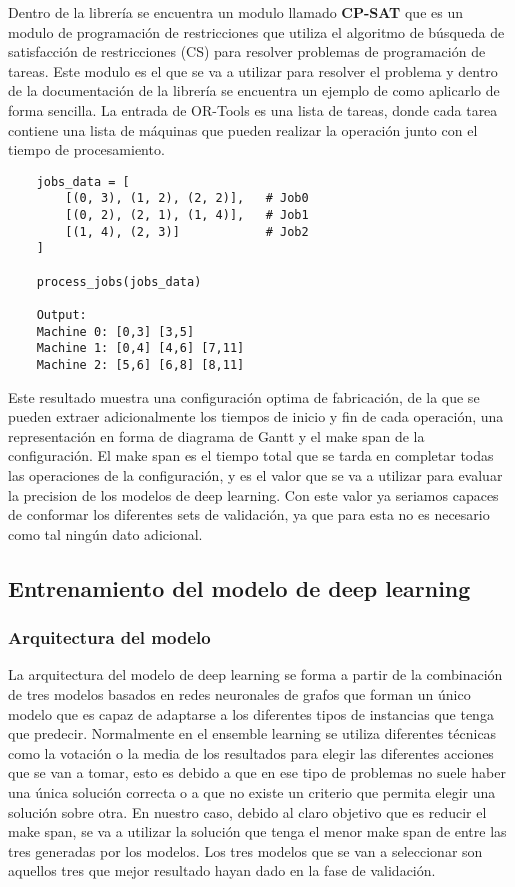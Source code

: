 Dentro de la librería se encuentra un modulo llamado \textbf{CP-SAT} que es un modulo de programación
de restricciones que utiliza el algoritmo de búsqueda de satisfacción de restricciones (CS) para resolver
problemas de programación de tareas. Este modulo es el que se va a utilizar para resolver el problema y
dentro de la documentación \cite{ortools-jobshop} de la librería se encuentra un ejemplo de como 
aplicarlo de forma sencilla. La entrada de OR-Tools es una lista de tareas, donde cada tarea contiene
una lista de máquinas que pueden realizar la operación junto con el tiempo de procesamiento.\medskip

\begin{lstlisting}
    jobs_data = [                   
        [(0, 3), (1, 2), (2, 2)],   # Job0
        [(0, 2), (2, 1), (1, 4)],   # Job1
        [(1, 4), (2, 3)]            # Job2
    ]
   
    process_jobs(jobs_data)

    Output:
    Machine 0: [0,3] [3,5]
    Machine 1: [0,4] [4,6] [7,11]
    Machine 2: [5,6] [6,8] [8,11]
\end{lstlisting}

Este resultado muestra una configuración optima de fabricación, de la que se pueden extraer
adicionalmente los tiempos de inicio y fin de cada operación, una representación en forma de
diagrama de Gantt y el make span de la configuración. El make span es el tiempo total que se 
tarda en completar todas las operaciones de la configuración, y es el valor que se va a utilizar
para evaluar la precision de los modelos de deep learning. Con este valor ya seriamos capaces
de conformar los diferentes sets de validación, ya que para esta no es necesario como tal ningún
dato adicional. 

\subsection{Entrenamiento del modelo de deep learning}
\subsubsection{Arquitectura del modelo }
La arquitectura del modelo de deep learning se forma a partir de la combinación de tres 
modelos basados en redes neuronales de grafos que forman un único modelo que es capaz 
de adaptarse a los diferentes tipos de instancias que tenga que predecir. Normalmente en el
ensemble learning se utiliza diferentes técnicas como la votación o la media de los resultados
para elegir las diferentes acciones que se van a tomar, esto es debido a que en ese tipo de problemas
no suele haber una única solución correcta o a que no existe un criterio que permita 
elegir una solución sobre otra. En nuestro caso, debido al claro objetivo que es reducir 
el make span, se va a utilizar la solución que tenga el menor make span de entre las tres 
generadas por los modelos. Los tres modelos que se van a seleccionar son aquellos tres 
que mejor resultado hayan dado en la fase de validación.\medskip

